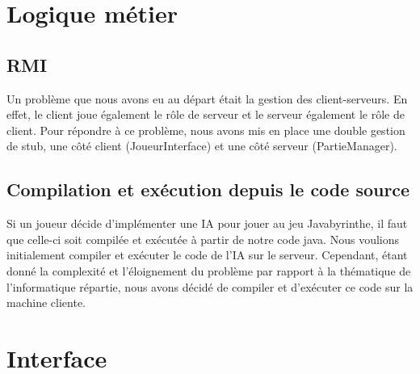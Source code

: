\section{Logique métier}

    \subsection{RMI}
        Un problème que nous avons eu au départ était la gestion des client-serveurs. En effet, le client joue également le rôle de serveur et le serveur également le rôle de client. Pour répondre à ce problème, nous avons mis en place une double gestion de stub, une côté client (JoueurInterface) et une côté serveur (PartieManager).

    \subsection{Compilation et exécution depuis le code source}
        Si un joueur décide d'implémenter une IA pour jouer au jeu Javabyrinthe, il faut que celle-ci soit compilée et exécutée à partir de notre code java. Nous voulions initialement compiler et exécuter le code de l'IA sur le serveur. Cependant, étant donné la complexité et l'éloignement du problème par rapport à la thématique de l'informatique répartie, nous avons décidé de compiler et d'exécuter ce code sur la machine cliente.


\section{Interface}
